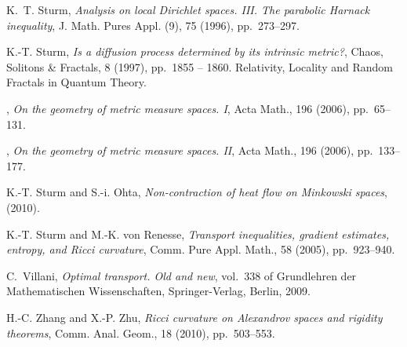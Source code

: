 \documentclass[reqno,11pt]{article}
\numberwithin{equation}{section}
\begin{document}
\begin{thebibliography}{10}
{\sc K.~T. Sturm}, {\em Analysis on local {D}irichlet spaces. {III}. {T}he
  parabolic {H}arnack inequality}, J. Math. Pures Appl. (9), 75 (1996),
  pp.~273--297.

{\sc K.-T. Sturm}, {\em Is a diffusion process determined by its intrinsic
  metric?}, Chaos, Solitons \& Fractals, 8 (1997), pp.~1855 -- 1860.
\newblock Relativity, Locality and Random Fractals in Quantum Theory.

\leavevmode\vrule height 2pt depth -1.6pt width 23pt, {\em On the geometry of
  metric measure spaces. {I}}, Acta Math., 196 (2006), pp.~65--131.

\leavevmode\vrule height 2pt depth -1.6pt width 23pt, {\em On the geometry of
  metric measure spaces. {II}}, Acta Math., 196 (2006), pp.~133--177.

{\sc K.-T. Sturm and S.-i. Ohta}, {\em Non-contraction of heat flow on
  {M}inkowski spaces},  (2010).

{\sc K.-T. Sturm and M.-K. von Renesse}, {\em Transport inequalities, gradient
  estimates, entropy, and {R}icci curvature}, Comm. Pure Appl. Math., 58
  (2005), pp.~923--940.

{\sc C.~Villani}, {\em Optimal transport. Old and new}, vol.~338 of Grundlehren
  der Mathematischen Wissenschaften, Springer-Verlag, Berlin, 2009.

{\sc H.-C. Zhang and X.-P. Zhu}, {\em Ricci curvature on {A}lexandrov spaces
  and rigidity theorems}, Comm. Anal. Geom., 18 (2010), pp.~503--553.

\end{thebibliography}

% 
% 
\end{document}
